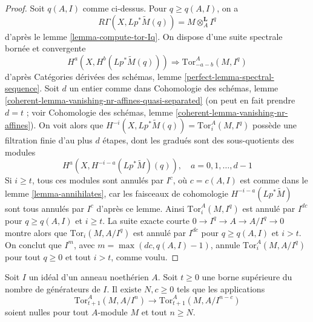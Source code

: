 \begin{proof}
Soit $q(A, I)$ comme ci-dessus. Pour $q \geq q(A, I)$, on a
$$
R\Gamma(X, Lp^*\widetilde{M}(q)) = M \otimes_A^\mathbf{L} I^q
$$
d'après le lemme \ref{lemma-compute-tor-Iq}. On dispose d'une suite spectrale bornée et convergente
$$
H^a(X, H^b(Lp^*\widetilde{M}(q))) \Rightarrow
\text{Tor}_{-a - b}^A(M, I^q)
$$
d'après Catégories dérivées des schémas, lemme \ref{perfect-lemma-spectral-sequence}. Soit $d$ un entier comme dans Cohomologie des schémas, lemme \ref{coherent-lemma-vanishing-nr-affines-quasi-separated} (on peut en fait prendre $d = t$ ; voir Cohomologie des schémas, lemme \ref{coherent-lemma-vanishing-nr-affines}). On voit alors que $H^{-i}(X, Lp^*\widetilde{M}(q)) = \text{Tor}_i^A(M, I^q)$ possède une filtration finie d'au plus $d$ étapes, dont les gradués sont des sous-quotients des modules
$$
H^a(X, H^{- i - a}(Lp^*\widetilde{M})(q)),\quad
a = 0, 1, \ldots, d - 1
$$
Si $i \geq t$, tous ces modules sont annulés par $I^c$, où $c = c(A, I)$ est comme dans le lemme \ref{lemma-annihilates}, car les faisceaux de cohomologie $H^{- i - a}(Lp^*\widetilde{M})$ sont tous annulés par $I^c$ d'après ce lemme. Ainsi $\text{Tor}_i^A(M, I^q)$ est annulé par $I^{dc}$ pour $q \geq q(A, I)$ et $i \geq t$. La suite exacte courte $0 \to I^q \to A \to A/I^q \to 0$ montre alors que $\text{Tor}_i(M, A/I^q)$ est annulé par $I^{dc}$ pour $q \geq q(A, I)$ et $i > t$. On conclut que $I^m$, avec $m = \max(dc, q(A, I) - 1)$, annule $\text{Tor}_i^A(M, A/I^q)$ pour tout $q \geq 0$ et tout $i > t$, comme voulu.
\end{proof}

\begin{lemma}
\label{lemma-tor-maps-vanish}
Soit $I$ un idéal d'un anneau noethérien $A$. Soit $t \geq 0$ une borne supérieure du nombre de générateurs de $I$. Il existe $N, c \geq 0$ tels que les applications
$$
\text{Tor}_{t + 1}^A(M, A/I^n) \to \text{Tor}_{t + 1}^A(M, A/I^{n - c})
$$
soient nulles pour tout $A$-module $M$ et tout $n \geq N$.
\end{lemma}

